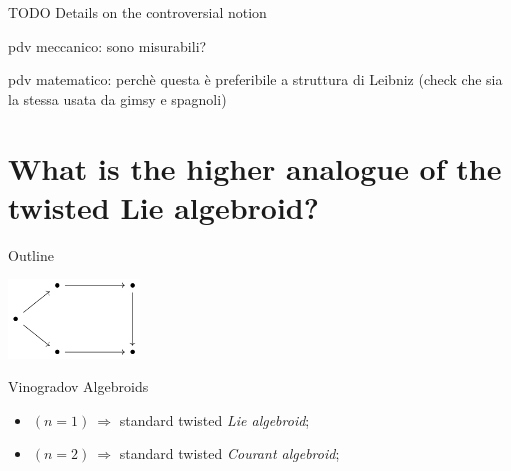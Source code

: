 \documentclass[10pt]{beamer}
\renewcommand{\checkpoint}[0]{
	\setcounter{tocdepth}{1}
	\addtocounter{framenumber}{-1}
 	\begin{frame}[t]{Outline}
  		\tableofcontents[currentsection]
		\begin{center}
			\includegraphics[width=3.5cm]{Pictures/Figure_pentagondiagm_page}
		\end{center}
	\end{frame}
}
\begin{document}
\begin{frame}[fragile]{TODO}
	Details on the controversial notion
	
	pdv meccanico: sono misurabili?
	
	pdv matematico: perchè questa è preferibile a struttura di Leibniz (check che sia la stessa usata da gimsy e spagnoli)
\end{frame}


\section{What is the \textbf{higher analogue} of the \textbf{twisted Lie algebroid}?}
\checkpoint	

\begin{frame}[t]{Vinogradov Algebroids}
	\begin{defblock}
				
	\end{defblock}
	\vfill
	\begin{itemize}
		\item<6-> $(n=1) ~ \Rightarrow$ standard twisted \emph{Lie algebroid};
		\item<7-> $(n=2) ~ \Rightarrow$ standard twisted \emph{Courant algebroid};
	\end{itemize}

\end{frame}
\end{document}
